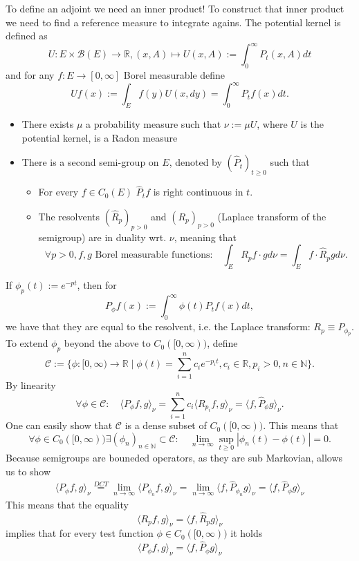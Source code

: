\documentclass[a4paper,12pt,twoside]{article}
\begin{document}
To define an adjoint we need an inner product! To construct that inner product we need to find a reference measure to integrate agains. The potential kernel is defined as 
\[
U: E \times \mathcal{B}(E) \to \mathbb{R}, (x,A) \mapsto U(x,A) := \int_0^\infty P_t(x,A)dt
\]
and for any $f: E\to [0,\infty]$ Borel measurable define 
\[
Uf (x) := \int_E f(y) U(x,dy) = \int_0^\infty P_t  f(x)dt.
\]
\begin{itemize}
    \item There exists $\mu$ a probability measure such that $\nu := \mu U$, where $U$ is the potential kernel, is a Radon measure 
    \item There is a second semi-group on $E$, denoted by $(\hat{P}_t)_{t \geq 0}$ such that 
    \begin{itemize}
        \item For every $f \in C_0(E)$ $\hat{P}_t f$ is right continuous in $t$.
        \item The resolvents $(\hat{R}_p)_{p >0}$ and $(R_p)_{p>0}$ (Laplace transform of the semigroup) are in duality wrt. $\nu$, meaning that 
        \[
        \forall p>0, f,g \text{ Borel measurable functions:} \quad \int_E R_p f \cdot g d \nu = \int_E f \cdot \hat{R}_p  g d \nu .
        \]
    \end{itemize}
\end{itemize}


If $\phi_p(t) := e^{-pt}$, then for
\[
P_\phi f(x) := \int_0^\infty \phi (t) P_t f(x) dt,
\]
we have that they are equal to the resolvent, i.e. the Laplace transform: $R_p \equiv P_{\phi_p}$. To extend $\phi_p$ beyond the above to $C_0 ([0,\infty))$, define 
\[
\mathcal{C} := \{ \phi: [0,\infty) \to \mathbb{R} \mid \phi (t) = \sum_{i=1}^n c_i e^{-p_i t}, c_i \in \mathbb{R}, p_i >0, n \in \mathbb{N} \}.
\]
By linearity 
\[
\forall \phi \in \mathcal{C} : \quad \langle P_\phi f,g \rangle_\nu = \sum_{i=1}^n c_i \langle R_{p_i} f,g \rangle_\nu = \langle f,\hat{P}_\phi  g \rangle_\nu.
\]
One can easily show that $\mathcal{C}$ is a dense subset of $C_0([0,\infty))$. This means that 
\[
\forall \phi \in C_0 ([0,\infty)) \exists (\phi_n)_{n \in \mathbb{N}} \subset \mathcal{C}: \quad \lim_{n \to \infty} \sup_{t \geq 0} |\phi_n (t) - \phi (t)|=0.
\]
Because semigroups are bouneded operators, as they are sub Markovian, allows us to show 
\begin{align*}
    \langle P_\phi f,g \rangle_\nu \stackrel{DCT}{=} \lim_{n \to \infty} \langle P_{\phi_n} f,g \rangle_\nu =\lim_{n \to \infty} \langle  f,\hat{P}_{\phi_n}g \rangle_\nu  = \langle f, \hat{P}_\phi g \rangle_\nu
\end{align*}
This means that the equality 
\[
\langle R_p f,g \rangle_\nu = \langle f,\hat{R}_p g \rangle_\nu 
\]
implies that for every test function $\phi \in C_0([0,\infty))$ it holds 
\[
\langle P_{\phi} f,g \rangle_\nu = \langle f,\hat{P}_{\phi} g \rangle_\nu 
\]
\end{document}
